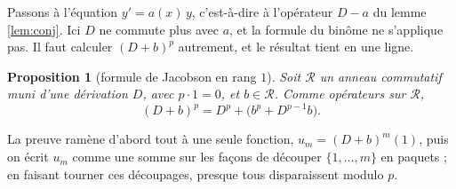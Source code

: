 \documentclass[11pt,a4paper]{article}
\theoremstyle{plain}
\newtheorem{proposition}[theoreme]{Proposition}
\theoremstyle{definition}
\theoremstyle{remark}
\newcommand{\Dx}{D}
\begin{document}
Passons à l'équation $y' = a(x)\,y$, c'est-à-dire à l'opérateur $\Dx - a$ du lemme \ref{lem:conj}. Ici $\Dx$ ne commute plus avec $a$, et la formule du binôme ne s'applique pas. Il faut calculer $(\Dx + b)^p$ autrement, et le résultat tient en une ligne.

\begin{proposition}[formule de Jacobson en rang $1$]\label{prop:jacobson}
Soit $\mathcal R$ un anneau commutatif muni d'une dérivation $\Dx$, avec $p \cdot 1 = 0$, et $b \in \mathcal R$. Comme opérateurs sur $\mathcal R$,
\[
  (\Dx + b)^p = \Dx^p + \big(b^p + \Dx^{p-1} b\big) .
\]
\end{proposition}

La preuve ramène d'abord tout à une seule fonction, $u_m = (\Dx+b)^m(1)$, puis on écrit $u_m$ comme une somme sur les façons de découper $\{1, \dots, m\}$ en paquets ; en faisant tourner ces découpages, presque tous disparaissent modulo $p$.
\end{document}
